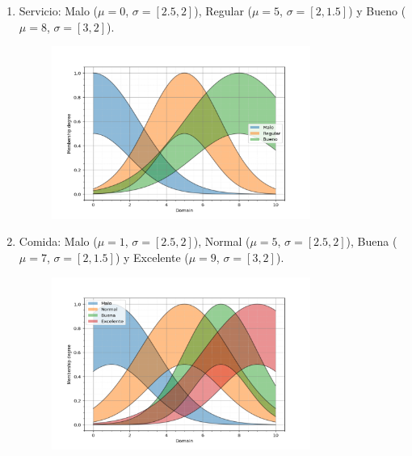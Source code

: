 \documentclass[11pt, letterpaper]{article}
\begin{document}
\begin{enumerate}
	\item Servicio: Malo ($\mu = 0$, $\sigma = [2.5,2]$), Regular ($\mu = 5$, $\sigma = [2,1.5]$) y Bueno ($\mu = 8$, $\sigma = [3,2]$).
	\begin{figure}[h]
		\centering
		\includegraphics[width=0.8\textwidth]{IMG/P11.png}
	\end{figure}
	
	\newpage
	
	\item Comida: Malo ($\mu = 1$, $\sigma = [2.5,2]$), Normal ($\mu = 5$, $\sigma = [2.5,2]$), Buena ($\mu = 7$, $\sigma = [2,1.5]$) y Excelente ($\mu = 9$, $\sigma = [3,2]$).
	\begin{figure}[h]
		\centering
		\includegraphics[width=0.8\textwidth]{IMG/P12.png}
	\end{figure}


\end{enumerate}
\end{document}
